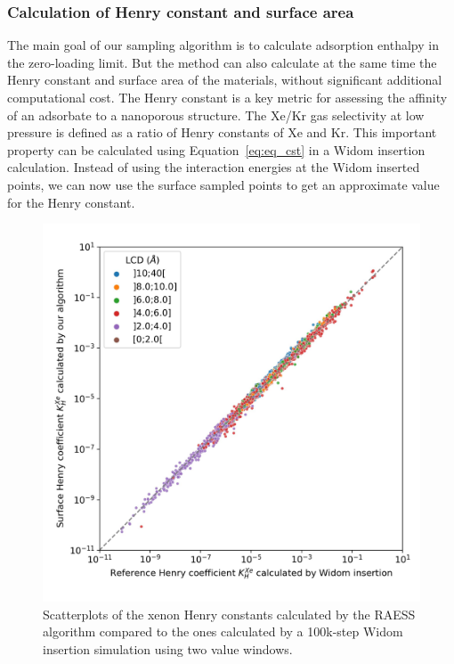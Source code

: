 \documentclass[main]{subfiles}
\begin{document}
\subsubsection{Calculation of Henry constant and surface area}

The main goal of our sampling algorithm is to calculate adsorption enthalpy in the zero-loading limit. But the method can also calculate at the same time the Henry constant and surface area of the materials, without significant additional computational cost. The Henry constant is a key metric for assessing the affinity of an adsorbate to a nanoporous structure. The Xe/Kr gas selectivity at low pressure is defined as a ratio of Henry constants of Xe and Kr. This important property can be calculated using Equation~\ref{eq:eq_cst} in a Widom insertion calculation. Instead of using the interaction energies at the Widom inserted points, we can now use the surface sampled points to get an approximate value for the Henry constant.

\begin{figure}[ht]
  \centering
  \includegraphics[width=0.6\linewidth]{figures/3-fastsim/K_Xe_widom_vs_K_Xe_surface_final_zoom.jpg}
    \caption{Scatterplots of the xenon Henry constants calculated by the RAESS algorithm compared to the ones calculated by a 100k-step Widom insertion simulation using two value windows.}\label{fgr:henry_scatter}
\end{figure}
\end{document}
